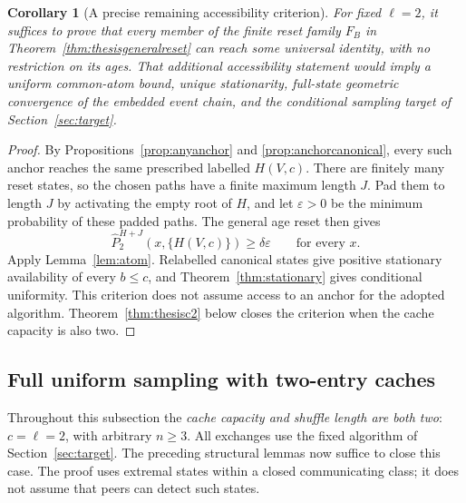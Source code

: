 \documentclass[11pt]{article}
\newtheorem{corollary}[theorem]{Corollary}
\begin{document}
\begin{corollary}[A precise remaining accessibility criterion]
\label{cor:anchorcriterion}
For fixed $\ell=2$, it suffices to prove that every member
of the finite reset family $F_B$ in
Theorem~\ref{thm:thesisgeneralreset} can reach \emph{some}
universal identity, with no restriction on its ages.
That additional accessibility
statement would imply a uniform common-atom bound, unique
stationarity, full-state geometric convergence of the
embedded event chain, and the conditional sampling target
of Section~\ref{sec:target}.
\end{corollary}
\begin{proof}
By Propositions~\ref{prop:anyanchor} and
\ref{prop:anchorcanonical}, every such anchor reaches the
same prescribed labelled $H(V,c)$.
There are finitely many reset states, so the chosen paths
have a finite maximum length $J$. Pad them to length $J$ by
activating the empty root of $H$, and let $\varepsilon>0$
be the minimum probability of these padded paths. The general age reset
then gives
\[
 \widehat P_2^{H+J}(x,\{H(V,c)\})
 \ge\delta\varepsilon\qquad\text{for every }x.
\]
Apply Lemma~\ref{lem:atom}. Relabelled canonical states
give positive stationary availability of every $b\le c$,
and Theorem~\ref{thm:stationary} gives conditional uniformity.
This criterion does not assume access to an anchor for
the adopted algorithm. Theorem~\ref{thm:thesisc2} below
closes the criterion when the cache capacity is also two.
\end{proof}

\subsection{Full uniform sampling with two-entry caches}
\label{sec:thesisc2}

Throughout this subsection the \emph{cache capacity and shuffle
length are both two}: $c=\ell=2$, with arbitrary $n\ge3$.
All exchanges use the fixed algorithm of Section~\ref{sec:target}.
The preceding structural lemmas now suffice to close this case.
The proof uses extremal states within a closed communicating
class; it does not assume that peers can detect such states.
\end{document}
